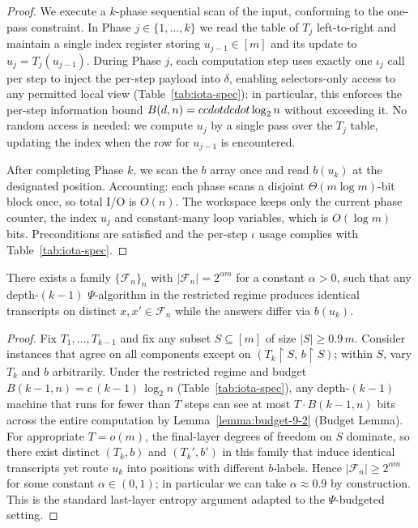 \begin{proof}
We execute a $k$-phase sequential scan of the input, conforming to the one-pass constraint. In Phase $j\in\{1,\dots,k\}$ we read the table of $T_j$ left-to-right and maintain a single index register storing $u_{j-1}\in[m]$ and its update to $u_j=T_j(u_{j-1})$. During Phase $j$, each computation step uses exactly one $\iota_j$ call per step to inject the per-step payload into $\delta$, enabling selectors-only access to any permitted local view (Table~\ref{tab:iota-spec}); in particular, this enforces the per-step information bound $B(d,n)=c \\cdot d \\cdot \log_{2} n$ without exceeding it. No random access is needed: we compute $u_j$ by a single pass over the $T_j$ table, updating the index when the row for $u_{j-1}$ is encountered.

After completing Phase $k$, we scan the $b$ array once and read $b(u_k)$ at the designated position. Accounting: each phase scans a disjoint $\Theta(m\log m)$-bit block once, so total I/O is $O(n)$. The workspace keeps only the current phase counter, the index $u_j$ and constant-many loop variables, which is $O(\log m)$ bits. Preconditions are satisfied and the per-step $\iota$ usage complies with Table~\ref{tab:iota-spec}.
\end{proof}

\begin{lemma}
\label{Lk:lem:fooling-Lk}
There exists a family $\{\mathcal{F}_n\}_{n}$ with $\lvert\mathcal{F}_n\rvert = 2^{\alpha m}$ for a constant $\alpha>0$, such that any depth-$(k{-}1)$ $\Psi$-algorithm in the restricted regime produces identical transcripts on distinct $x,x'\in\mathcal{F}_n$ while the answers differ via $b(u_k)$.
\end{lemma}

\begin{proof}
Fix $T_1,\ldots,T_{k-1}$ and fix any subset $S\subseteq[m]$ of size $\lvert S\rvert \ge 0.9\,m$. Consider instances that agree on all components except on $(T_k\upharpoonright S,\, b\upharpoonright S)$; within $S$, vary $T_k$ and $b$ arbitrarily. Under the restricted regime and budget $B(k{-}1,n)=c\,(k{-}1)\,\log_{2} n$ (Table~\ref{tab:iota-spec}), any depth-$(k{-}1)$ machine that runs for fewer than $T$ steps can see at most $T\cdot B(k{-}1,n)$ bits across the entire computation by Lemma~\ref{lemma:budget-9-2} (Budget Lemma). For appropriate $T=o(m)$, the final-layer degrees of freedom on $S$ dominate, so there exist distinct $(T_k,b)$ and $(T_k',b')$ in this family that induce identical transcripts yet route $u_k$ into positions with different $b$-labels. Hence $\lvert\mathcal{F}_n\rvert \ge 2^{\alpha m}$ for some constant $\alpha\in(0,1)$; in particular we can take $\alpha\approx 0.9$ by construction. This is the standard last-layer entropy argument adapted to the $\Psi$-budgeted setting.
\end{proof}

